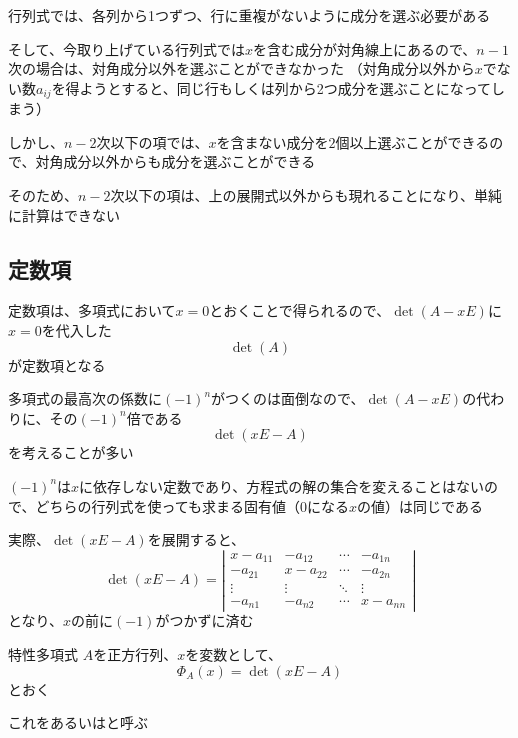 \documentclass[../../../topic_linear-algebra]{subfiles}
\begin{document}
行列式では、各列から1つずつ、行に重複がないように成分を選ぶ必要がある

そして、今取り上げている行列式では$x$を含む成分が対角線上にあるので、$n-1$次の場合は、対角成分以外を選ぶことができなかった
（対角成分以外から$x$でない数$a_{ij}$を得ようとすると、同じ行もしくは列から2つ成分を選ぶことになってしまう）

\br

しかし、$n-2$次以下の項では、$x$を含まない成分を$2$個以上選ぶことができるので、対角成分以外からも成分を選ぶことができる

そのため、$n-2$次以下の項は、上の展開式以外からも現れることになり、単純に計算はできない

\subsection{定数項}

定数項は、多項式において$x=0$とおくことで得られるので、$\det(A - xE)$に$x=0$を代入した
\begin{equation*}
  \det(A)
\end{equation*}
が定数項となる

\sectionline

多項式の最高次の係数に$(-1)^n$がつくのは面倒なので、$\det(A - xE)$の代わりに、その$(-1)^n$倍である
\begin{equation*}
  \det(xE - A)
\end{equation*}
を考えることが多い

\br

$(-1)^n$は$x$に依存しない定数であり、方程式の解の集合を変えることはないので、どちらの行列式を使っても求まる固有値（0になる$x$の値）は同じである

\br

実際、$\det(xE - A)$を展開すると、
\begin{equation*}
  \det(xE - A) = \left| \begin{matrix}
    x - a_{11} & -a_{12}    & \cdots & -a_{1n}    \\
    -a_{21}    & x - a_{22} & \cdots & -a_{2n}    \\
    \vdots     & \vdots     & \ddots & \vdots     \\
    -a_{n1}    & -a_{n2}    & \cdots & x - a_{nn}
  \end{matrix} \right|
\end{equation*}
となり、$x$の前に$(-1)$がつかずに済む

\sectionline

\begin{definition*}{特性多項式}
  $A$を正方行列、$x$を変数として、
  \begin{equation*}
    \Phi_A(x) = \det(xE - A)
  \end{equation*}
  とおく

  これをあるいはと呼ぶ
\end{definition*}
\end{document}
